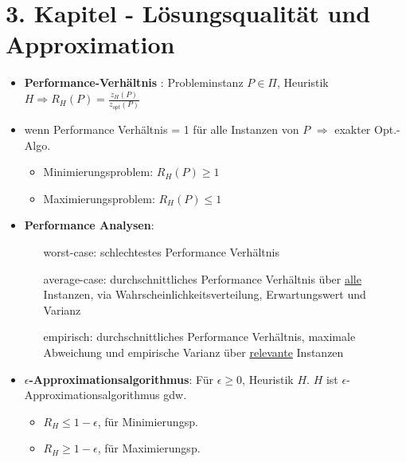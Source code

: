 \documentclass[12pt]{article}
\begin{document}
	\section{3. Kapitel - Lösungsqualität und Approximation}
		\begin{itemize}
			\item\textbf{Performance-Verhältnis} \label{Performance Verhaeltnis}: Probleminstanz $P\in \Pi$, Heuristik \\ 
				$H \Rightarrow R_H(P)=\frac{z_H(P)}{z_{opt}(P)}$ 
			\item wenn Performance Verhältnis = 1 für alle Instanzen von $P$ $\Rightarrow$ exakter Opt.-Algo.
				\begin{itemize}
					\item Minimierungsproblem: $R_H(P) \ge 1$
					\item Maximierungsproblem: $R_H(P) \le 1$
				\end{itemize}
			\item \textbf{Performance Analysen}\label{Performance Analyse}:
				\begin{itemize}
					\item[worst-case:] schlechtestes Performance Verhältnis
					\item[average-case:] durchschnittliches Performance Verhältnis über \underline{alle} Instanzen, via Wahrscheinlichkeitsverteilung, Erwartungswert und Varianz
					\item[empirisch:] durchschnittliches Performance Verhältnis, maximale Abweichung und empirische Varianz über \underline{relevante} Instanzen
				\end{itemize}
			\item \textbf{$\epsilon$-Approximationsalgorithmus}\label{eApproxAlgo}: Für $\epsilon\ge 0$, Heuristik $H$. $H$ ist $\epsilon$-Approximationsalgorithmus gdw.
				\begin{itemize}
					\item $R_H \le 1- \epsilon$, für Minimierungsp.
					\item $R_H \ge 1- \epsilon$, für Maximierungsp.
				\end{itemize}
		\end{itemize}
\end{document}
